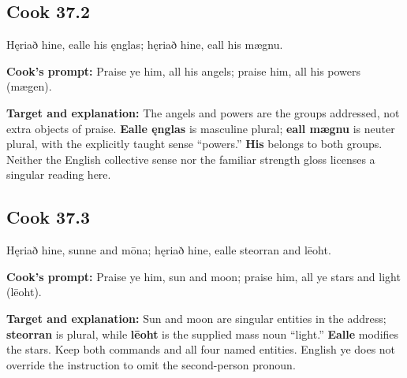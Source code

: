 \par\begin{minipage}{\linewidth}\raggedright
\subsection*{Cook 37.2}

Hęriað hine, ealle his ęnglas; hęriað hine, eall his mægnu.

\textbf{Cook's prompt:} Praise ye him, all his angels; praise him, all his powers (mægen).

\textbf{Target and explanation:} The angels and powers are the groups addressed, not extra objects of praise. \textbf{Ealle ęnglas} is masculine plural; \textbf{eall mægnu} is neuter plural, with the explicitly taught sense “powers.” \textbf{His} belongs to both groups. Neither the English collective sense nor the familiar strength gloss licenses a singular reading here.

\end{minipage}\par\addvspace{4pt}

\par\begin{minipage}{\linewidth}\raggedright
\subsection*{Cook 37.3}

Hęriað hine, sunne and mōna; hęriað hine, ealle steorran and lēoht.

\textbf{Cook's prompt:} Praise ye him, sun and moon; praise him, all ye stars and light (lēoht).

\textbf{Target and explanation:} Sun and moon are singular entities in the address; \textbf{steorran} is plural, while \textbf{lēoht} is the supplied mass noun “light.” \textbf{Ealle} modifies the stars. Keep both commands and all four named entities. English ye does not override the instruction to omit the second-person pronoun.

\end{minipage}\par\addvspace{4pt}

